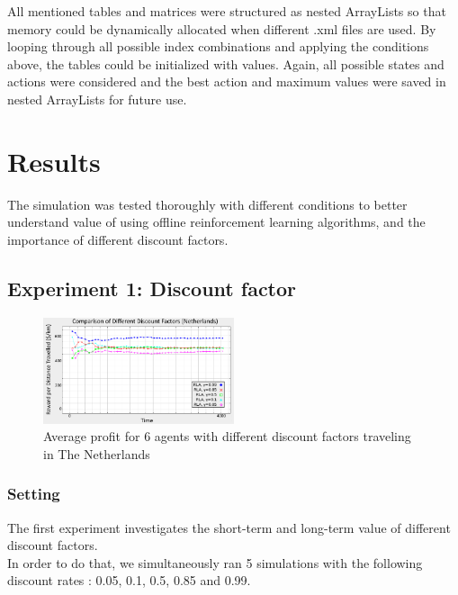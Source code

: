 \documentclass[11pt]{article}
\begin{document}
All mentioned tables and matrices were structured as nested ArrayLists so that memory could be dynamically allocated when different .xml files are used. By looping through all possible index combinations and applying the conditions above, the tables could be initialized with values. Again, all possible states and actions were considered and the best action and maximum values were saved in nested ArrayLists for future use. 

\section{Results}
The simulation was tested thoroughly with different conditions to better understand value of using offline reinforcement learning algorithms, and the importance of different discount factors. 
\subsection{Experiment 1: Discount factor}
\begin{figure}
	\centering
	\includegraphics[width=0.5\textwidth]{p1}
	\caption{Average profit for 6 agents with different discount factors traveling in The Netherlands}
	\label{figure:1}
\end{figure}
\subsubsection{Setting}
The first experiment investigates the short-term and long-term value of different discount factors.\\

In order to do that, we simultaneously ran 5 simulations with the following discount rates : 0.05, 0.1, 0.5, 0.85 and 0.99.\\
\end{document}
